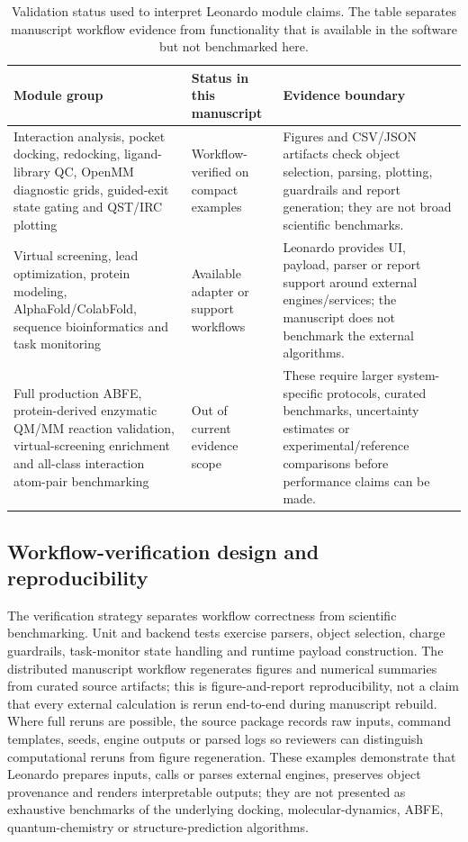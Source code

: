 \documentclass[pdflatex,sn-vancouver-num]{sn-jnl}
\begin{document}
\begin{table}[htbp]
\caption{Validation status used to interpret Leonardo module claims.  The table separates manuscript workflow evidence from functionality that is available in the software but not benchmarked here.}\label{tab:validationstatus}
\footnotesize
\begin{tabularx}{\textwidth}{>{\raggedright\arraybackslash}p{}>{\raggedright\arraybackslash}p{}>{\raggedright\arraybackslash}X}
\toprule
Module group & Status in this manuscript & Evidence boundary \\
\midrule
Interaction analysis, pocket docking, redocking, ligand-library QC, OpenMM diagnostic grids, guided-exit state gating and QST/IRC plotting & Workflow-verified on compact examples & Figures and CSV/JSON artifacts check object selection, parsing, plotting, guardrails and report generation; they are not broad scientific benchmarks. \\
Virtual screening, lead optimization, protein modeling, AlphaFold/ColabFold, sequence bioinformatics and task monitoring & Available adapter or support workflows & Leonardo provides UI, payload, parser or report support around external engines/services; the manuscript does not benchmark the external algorithms. \\
Full production ABFE, protein-derived enzymatic QM/MM reaction validation, virtual-screening enrichment and all-class interaction atom-pair benchmarking & Out of current evidence scope & These require larger system-specific protocols, curated benchmarks, uncertainty estimates or experimental/reference comparisons before performance claims can be made. \\
\bottomrule
\end{tabularx}
\end{table}

\subsection{Workflow-verification design and reproducibility}

The verification strategy separates workflow correctness from scientific benchmarking.  Unit and backend tests exercise parsers, object selection, charge guardrails, task-monitor state handling and runtime payload construction.  The distributed manuscript workflow regenerates figures and numerical summaries from curated source artifacts; this is figure-and-report reproducibility, not a claim that every external calculation is rerun end-to-end during manuscript rebuild.  Where full reruns are possible, the source package records raw inputs, command templates, seeds, engine outputs or parsed logs so reviewers can distinguish computational reruns from figure regeneration.  These examples demonstrate that Leonardo prepares inputs, calls or parses external engines, preserves object provenance and renders interpretable outputs; they are not presented as exhaustive benchmarks of the underlying docking, molecular-dynamics, ABFE, quantum-chemistry or structure-prediction algorithms.
\end{document}
